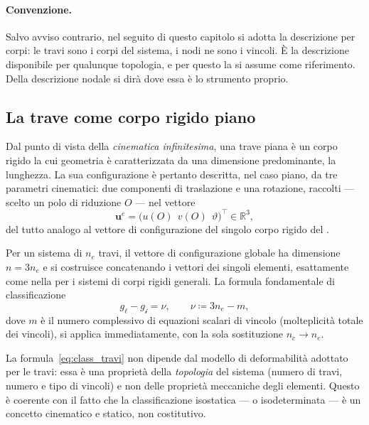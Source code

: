 \paragraph{Convenzione.}
Salvo avviso contrario, nel seguito di questo capitolo si
adotta la descrizione per corpi: le travi sono i corpi del
sistema, i nodi ne sono i vincoli. È la descrizione
disponibile per qualunque topologia, e per questo la si
assume come riferimento. Della descrizione nodale si dirà
dove essa è lo strumento proprio.


\subsection{La trave come corpo rigido piano}
\label{subsec:trave_SCR}

Dal punto di vista della \emph{cinematica infinitesima},
una trave piana è un corpo rigido la cui geometria è
caratterizzata da una dimensione predominante, la lunghezza.
La sua configurazione è pertanto descritta, nel caso piano,
da tre parametri cinematici: due componenti di traslazione
e una rotazione, raccolti --- scelto un polo di riduzione
$O$ --- nel vettore
\begin{equation}
	\bm{u}^e
	=
	\bigl(
	u(O)\,\; v(O)\,\; \vartheta
	\bigr)^{\!\top}
	\in \mathbb{R}^{3},
\end{equation}
del tutto analogo al vettore di configurazione del singolo
corpo rigido del .

Per un sistema di $n_e$ travi, il vettore di configurazione
globale ha dimensione $n = 3n_e$ e si costruisce
concatenando i vettori dei singoli elementi, esattamente
come nella  per i sistemi di corpi
rigidi generali. La formula fondamentale di classificazione
\begin{equation}\label{eq:class_travi}
	g_\ell - g_{\mathscr{i}} = \nu, \qquad
	\nu \coloneqq 3n_e - m,
\end{equation}
dove $m$ è il numero complessivo di equazioni scalari di
vincolo (molteplicità totale dei vincoli), si applica
immediatamente, con la sola sostituzione $n_c \to n_e$.

\begin{oss}
	La formula~\eqref{eq:class_travi} non dipende dal
	modello di deformabilità adottato per le travi: essa è
	una proprietà della \emph{topologia} del sistema
	(numero di travi, numero e tipo di vincoli) e non
	delle proprietà meccaniche degli elementi. Questo è
	coerente con il fatto che la classificazione isostatica
	--- o isodeterminata --- è un concetto cinematico e
	statico, non costitutivo.
\end{oss}


